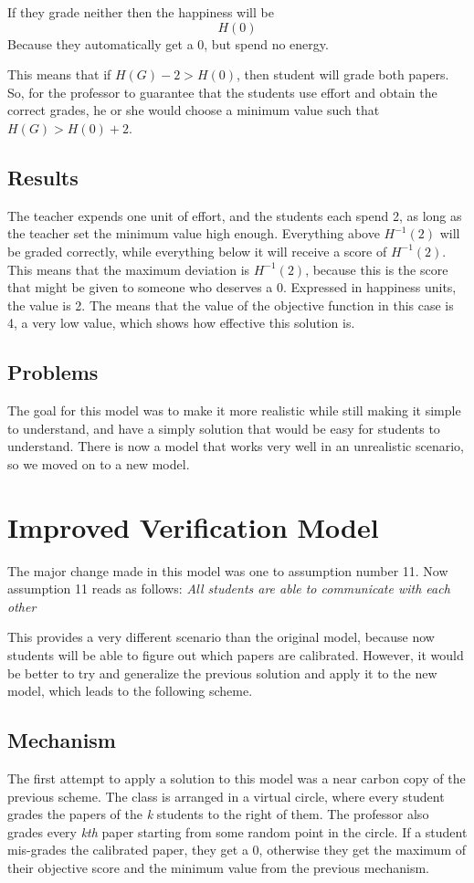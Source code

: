 \documentclass[12pt, Arial]{article}
\begin{document}
If they grade neither then the happiness will be $$H(0)$$ Because they automatically get a 0, but spend no energy.

This means that if $H(G) - 2 > H(0)$, then student will grade both papers. So, for the professor to guarantee that the students use effort and obtain the correct grades, he or she would choose a minimum value such that $H(G) > H(0) + 2$.
\subsection{Results}
The teacher expends one unit of effort, and the students each spend 2, as long as the teacher set the minimum value high enough.
Everything above $H^{-1}(2)$ will be graded correctly, while everything below it will receive a score of $H^{-1}(2)$.
This means that the maximum deviation is $H^{-1}(2)$, because this is the score that might be given to someone who deserves a 0. Expressed in happiness units, the value is 2.
The means that the value of the objective function in this case is 4, a very low value, which shows how effective this solution is.

\subsection{Problems}
The goal for this model was to make it more realistic while still making it simple to understand, and have a simply solution that would be easy for students to understand. There is now a model that works very well in an unrealistic scenario, so we moved on to a new model. 

\section{Improved Verification Model}
The major change made in this model was one to assumption number 11. Now assumption 11 reads as follows:
\emph{All students are able to communicate with each other}

This provides a very different scenario than the original model, because now students will be able to figure out which papers are calibrated. However, it would be better to try and generalize the previous solution and apply it to the new model, which leads to the following scheme.

\subsection{Mechanism}
The first attempt to apply a solution to this model was a near carbon copy of the previous scheme.
The class is arranged in a virtual circle, where every student grades the papers of the \emph{k} students to the right of them. The professor also grades every \emph{kth} paper starting from some random point in the circle. If a student mis-grades the calibrated paper, they get a 0, otherwise they get the maximum of their objective score and the minimum value from the previous mechanism.
\end{document}
